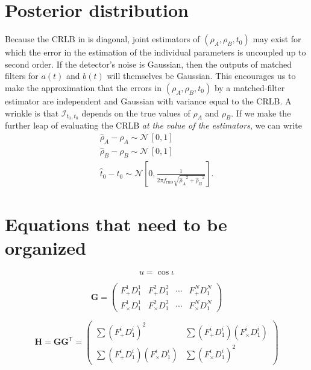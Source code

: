 \documentclass{iopart}
\begin{document}
\section{Posterior distribution}

Because the \ac{CRLB} in  is diagonal, joint estimators of $(\rho_A, \rho_B, t_0)$ may exist for which the error in the estimation of the individual parameters is uncoupled up to second order.  If the detector's noise is Gaussian, then the outputs of matched filters for $a(t)$ and $b(t)$ will themselves be Gaussian.  This encourages us to make the approximation that the errors in $(\rho_A, \rho_B, t_0)$ by a matched\nobreakdashes-filter estimator are independent and Gaussian with variance equal to the \ac{CRLB}.  A wrinkle is that $\mathcal{I}_{t_0,t_0}$ depends on the true values of $\rho_A$ and $\rho_B$.  If we make the further leap of evaluating the \ac{CRLB} \emph{at the value of the estimators}, we can write
%
\begin{eqnarray}
\hat{\rho}_A - \rho_A \sim \mathcal{N}\, [0, 1] \\
\hat{\rho}_B - \rho_B \sim \mathcal{N}\, [0, 1] \\
\hat{t}_0 - t_0 \sim \mathcal{N} \left[0, \frac{1}{2 \pi f_\mathrm{rms} \sqrt{{\hat{\rho}_A}^2 + {\hat{\rho}_B}^2}}\right].
\end{eqnarray}

\section{Equations that need to be organized}

\begin{equation}
	u = \cos \iota
\end{equation}

\begin{equation}
	\mathbf{G} =
	\left(
		\begin{array}{cccc}
			F_+^1 D_1^1 & F_+^2 D_1^2 & \cdots & F_+^N D_1^N \\
			F_\times^1 D_1^1 & F_\times^2 D_1^2 & \cdots & F_\times^N D_1^N
		\end{array}
	\right)
\end{equation}

\begin{equation}
	\mathbf{H} = \mathbf{G}\mathbf{G}^\mathsf{T} =
	\left(
		\begin{array}{cc}
			\sum \left(F_+^i D_1^i\right)^2 & \sum \left(F_+^i D_1^i\right)\left(F_\times^i D_1^i\right) \\
			\sum \left(F_+^i D_1^i\right)\left(F_\times^i D_1^i\right) & \sum \left(F_\times^i D_1^i\right)^2
		\end{array}
	\right)
\end{equation}
\end{document}
